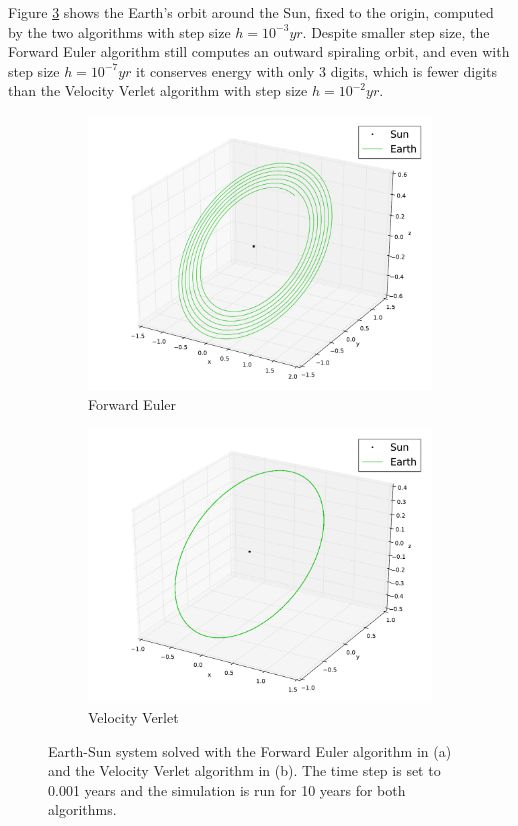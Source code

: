 \documentclass{article}
\begin{document}
Figure \ref{fig:2body} shows the Earth's orbit around the Sun, fixed to the origin, computed by the two algorithms with step size $h=10^{-3}yr$. Despite smaller step size, the Forward Euler algorithm still computes an outward spiraling orbit, and even with step size $h=10^{-7}yr$ it conserves energy with only 3 digits, which is fewer digits than the Velocity Verlet algorithm with step size $h=10^{-2}yr$. 

\begin{figure}
\begin{subfigure}{0.5\textwidth}
\centering
\includegraphics[width=\linewidth]{fig/Two_Bodies_Forward_Euler.pdf}
\caption{Forward Euler}
\label{subfig:2body_euler}
\end{subfigure}
\begin{subfigure}{0.5\textwidth}
\centering
\includegraphics[width=\linewidth]{fig/Two_Bodies_Velocity_Verlet.pdf}
\caption{Velocity Verlet }
\label{subfig:2body_verlet}
\end{subfigure}
\caption{Earth-Sun system solved with the Forward Euler algorithm in (a) and the Velocity Verlet algorithm in (b). The time step is set to 0.001 years and the simulation is run for 10 years for both algorithms.}
\label{fig:2body}
\end{figure}
\end{document}
